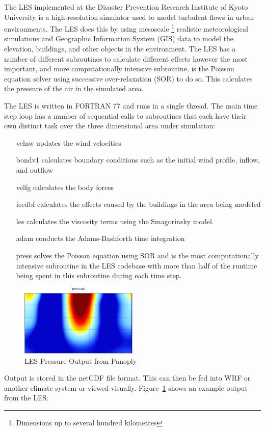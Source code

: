 The LES implemented at the Disaster Prevention Research Institute of Kyoto
University is a high-resolution simulator used to model turbulent flows in urban
environments. The LES does this by using mesoscale \footnote{Dimensions up to
several hundred kilometres} realistic meteorological simulations and Geographic
Information System (GIS) data to model the elevation, buildings, and other
objects in the environment. The LES has a number of different subroutines to
calculate different effects however the most important, and more computationally
intensive subroutine, is the Poisson equation solver using successive
over-relaxation (SOR) to do so. This calculates the pressure of the air in the
simulated area.

The LES is written in FORTRAN 77 and runs in a single thread. The main time step
loop has a number of sequential calls to subroutines that each have their own
distinct task over the three dimensional area under simulation:

\begin{itemize}[noitemsep,nolistsep]

    \item[velnw] updates the wind velocities

    \item[bondv1] calculates boundary conditions such as the initial wind
    profile, inflow, and outflow

    \item[velfg] calculates the body forces

    \item[feedbf] calculates the effects caused by the buildings in the area
    being modeled

    \item[les] calculates the viscosity terms using the Smagorinsky model.

    \item[adam] conducts the Adams-Bashforth time integration

    \item[press] solves the Poisson equation using SOR and is the most
    computationally intensive subroutine in the LES codebase with more than half
    of the runtime being spent in this subroutine during each time step.

\end{itemize}

\begin{figure}
    \includegraphics[width=0.5\textwidth]{graphs/pressure_in_LES_output_p.png}
    \caption{LES Pressure Output from Panoply}
    \label{fig:lespressure}
\end{figure}

Output is stored in the netCDF file format. This can then be fed into WRF or
another climate system or viewed visually. Figure~\ref{fig:lespressure} shows an
example output from the LES.
